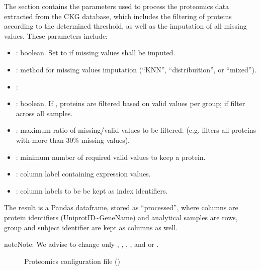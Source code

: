 \documentclass[letterpaper,10pt,english]{sphinxmanual}
\let\sphinxpxdimen\pdfpxdimen\else\newdimen\sphinxpxdimen
\begin{document}
The  section contains the parameters used to process the proteomics data extracted from the CKG database, which includes the filtering of proteins according to the determined threshold, as well as the imputation of all missing values. These parameters include:
\begin{itemize}
\item {} 
: boolean. Set to  if missing values shall be imputed.

\item {} 
: method for missing values imputation (“KNN”, “distribuition”, or “mixed”).

\item {} 
:

\item {} 
: boolean. If , proteins are filtered based on valid values per group; if  filter across all samples.

\item {} 
: maximum ratio of missing/valid values to be filtered. (e.g.  filters all proteins with more than 30\% missing values).

\item {} 
: minimum number of required valid values to keep a protein.

\item {} 
: column label containing expression values.

\item {} 
: column labels to be be kept as index identifiers.

\end{itemize}

The result is a Pandas dataframe, stored as “processed”, where columns are protein identifiers (UniprotID\textasciitilde{}GeneName) and analytical samples are rows, group and subject identifier are kept as columns as well.

\begin{sphinxadmonition}{note}{Note:}
We advise to change only , , , , and  or .
\end{sphinxadmonition}
\begin{wrapfigure}{r}{350\sphinxpxdimen}
\centering
\noindent\sphinxincludegraphics[width=350\sphinxpxdimen]{{proteomics_config_2}.png}
\caption{Proteomics configuration file ()}\label{\detokenize{getting_started/data_settings/proteomics:id2}}\end{wrapfigure}
\end{document}
